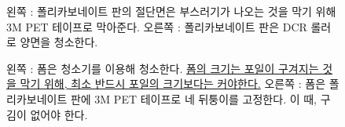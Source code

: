 \documentclass[11pt]{article}
\begin{document}
\begin{figure}[htb]
  \centering
  \caption[폴리카보네이트 판의 절단면 처리]{왼쪽 : 폴리카보네이트 판의 절단면은 부스러기가 나오는 것을 막기 위해 3M PET 테이프로 막아준다. 오른쪽 : 폴리카보네이트 판은 DCR 롤러로 양면을 청소한다.}
  \label{fig:polycarbonate}
  \end{figure}

\begin{figure}[htb]
  \centering
  \caption[폼의 처리]{왼쪽 : 폼은 청소기를 이용해 청소한다. \uline{폼의 크기는 포일이 구겨지는 것을 막기 위해, 최소 반드시 포일의 크기보다는 커야한다.} 오른쪽 : 폼은 폴리카보네이트 판에 3M PET 테이프로 네 뒤퉁이를 고정한다. 이 때, 구김이 없어야 한다.}
  \label{fig:foam}
\end{figure}
\end{document}
